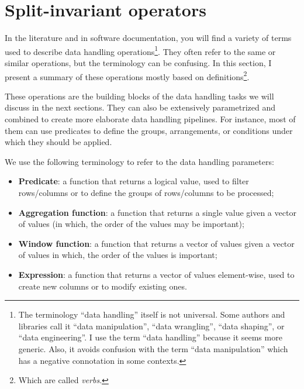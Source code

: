\section{Split-invariant operators}

In the literature and in software documentation, you will find a variety of terms used to
describe data handling operations\footnote{%
  The terminology ``data handling'' itself is not universal.  Some authors and libraries
  call it ``data manipulation'', ``data wrangling'', ``data shaping'', or ``data
  engineering''.  I use the term ``data handling'' because it seems more generic.
  Also, it avoids confusion with the term ``data
  manipulation'' which has a negative connotation in some contexts.}. %
They often refer to the same or similar operations, but the terminology can be confusing.
In this section, I present a summary of these operations mostly based on
\textcite{Wickham2023} definitions\footnote{Which are called \emph{verbs}.}.


These operations are the building blocks of the data handling tasks we will discuss in the
next sections.  They can also be extensively parametrized and combined to create more
elaborate data handling pipelines.  For instance, most of them can use predicates to
define the groups, arrangements, or conditions under which they should be applied.

We use the following terminology to refer to the data handling parameters:
\begin{itemize}
  \item \textbf{Predicate}: a function that returns a logical value, used to filter
    rows/columns or to define the groups of rows/columns to be processed;
  \item \textbf{Aggregation function}: a function that returns a single value given a vector
    of values (in which, the order of the values may be important);
  \item \textbf{Window function}: a function that returns a vector of values given a vector
    of values in which, the order of the values is important;
  \item \textbf{Expression}: a function that returns a vector of values element-wise, used to create new
    columns or to modify existing ones.
\end{itemize}

